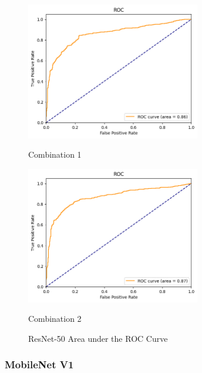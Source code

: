 \begin{figure}[H]
    \centering
    \begin{minipage}[b]{0.49\textwidth}
        \centering
        \includegraphics[width=\textwidth, height=6cm]{Figures/balanced_data/less_data/withoutbn/resnet/roc.png}
        \captionsetup{labelformat=empty}
        \caption{Combination 1}
        \label{fig:u_wo_r_roc}
    \end{minipage}
    \hfill
    \begin{minipage}[b]{0.49\textwidth}
        \centering
        \includegraphics[width=\textwidth, height=6cm]{Figures/balanced_data/less_data/withbn/resnet/roc.png}
        \captionsetup{labelformat=empty}
        \caption{Combination 2}
        \label{fig:u_w_r_roc}
    \end{minipage}
    \captionsetup{labelformat=default}
    \caption{ResNet-50 Area under the ROC Curve}
\end{figure}

\subsubsection{MobileNet V1}


